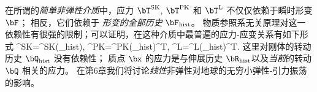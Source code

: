 在所谓的{\em 简单非弹性介质\/}中，应力
$\bT^{\rm SK}$, $\bT^{\rm PK}$ 和 $\bT^{\rm L}$ 
%
%
不仅仅依赖于瞬时形变 $\bF$；
相反，它们依赖于 {\em 形变的全部历史\/}
$\bF_{\rm hist}$。 物质参照系无关原理对这一依赖性有很强的限制；可以证明，在这种介质中最普遍的应力-应变关系有如下形式
\eq
\bT^{\rm SK}=\bT^{\rm SK}(\bR_{\rm hist}),
\en
\eq
\label{2.last1}
\bT^{\rm PK}=\bT^{\rm PK}(\bR_{\rm hist})\cdot\bQ^{\rm T},
\en
\eq
\label{2.last2}
\bT^{\rm L}=\bQ\cdot\bT^{\rm L}(\bR_{\rm hist})\cdot\bQ^{\rm T}.
\en
这里对刚体的转动历史
$\bQ_{\rm hist}$ 没有依赖性；
质点 $\bx$ 的应力是与伸展历史 $\bR_{\rm hist}$以及{\em 当前}的转动 $\bQ$ 相关的应力。
在第6章我们将讨论{\em 线性\/}非弹性对地球的无穷小弹性-引力振荡的影响。
%
%
%

